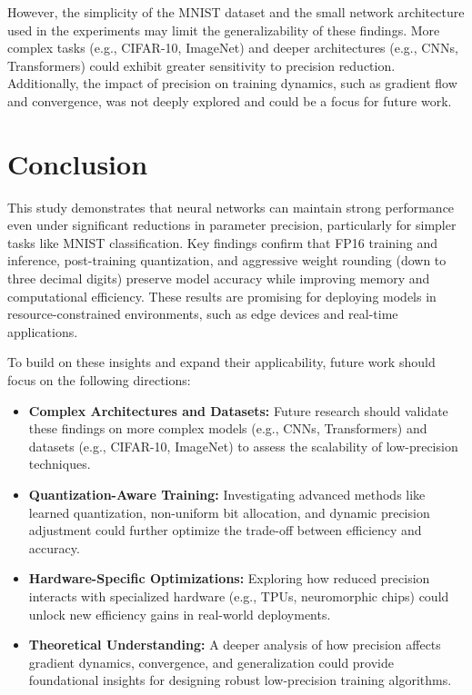 \documentclass[11pt]{article}
\begin{document}
However, the simplicity of the MNIST dataset and the small network architecture used in
the experiments may limit the generalizability of these findings. More complex tasks
(e.g., CIFAR-10, ImageNet) and deeper architectures (e.g., CNNs, Transformers) could
exhibit greater sensitivity to precision reduction. Additionally, the impact of precision
on training dynamics, such as gradient flow and convergence, was not deeply explored and
could be a focus for future work.


\section{Conclusion}


This study demonstrates that neural networks can maintain strong performance even under
significant reductions in parameter precision, particularly for simpler tasks like MNIST
classification. Key findings confirm that FP16 training and inference, post-training
quantization, and aggressive weight rounding (down to three decimal digits) preserve model
accuracy while improving memory and computational efficiency. These results are promising
for deploying models in resource-constrained environments, such as edge devices and
real-time applications.

To build on these insights and expand their applicability, future work should focus on the
following directions:

\begin{itemize}
\item \textbf{Complex Architectures and Datasets:} Future research should validate these
findings on more complex models (e.g., CNNs, Transformers) and datasets (e.g., CIFAR-10,
ImageNet) to assess the scalability of low-precision techniques.

\item \textbf{Quantization-Aware Training:} Investigating advanced methods like learned
quantization, non-uniform bit allocation, and dynamic precision adjustment could further
optimize the trade-off between efficiency and accuracy.

\item \textbf{Hardware-Specific Optimizations:} Exploring how reduced precision interacts
with specialized hardware (e.g., TPUs, neuromorphic chips) could unlock new efficiency
gains in real-world deployments.

\item \textbf{Theoretical Understanding:} A deeper analysis of how precision affects
gradient dynamics, convergence, and generalization could provide foundational insights for
designing robust low-precision training algorithms.
\end{itemize}

\newpage
\printbibliography%
\end{document}
